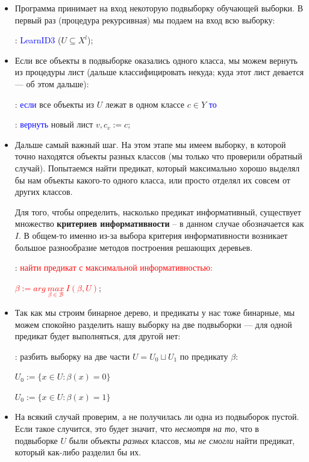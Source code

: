 \documentclass{article}
\begin{document}
\begin{itemize}
\item Программа принимает на вход некоторую подвыборку обучающей выборки. В первый раз (процедура рекурсивная) мы подаем на вход всю выборку:

: \textcolor{blue}{LearnID3} ($U \subseteq X^l$);

\item Если все объекты в подвыборке оказались одного класса, мы можем вернуть из процедуры лист (дальше классифицировать некуда; куда этот лист девается --- об этом дальше):

: \textcolor{blue}{если}
				все объекты из $U$ лежат в одном классе $c \in Y$
			\textcolor{blue}{то}

: \qquad \textcolor{blue}{вернуть} новый лист $v, c_v := c$;

\item Дальше самый важный шаг. На этом этапе мы имеем выборку, в которой точно находятся объекты разных классов (мы только что проверили обратный случай). Попытаемся найти предикат, который максимально хорошо выделял бы нам объекты какого-то одного класса, или просто отделял их совсем от других классов.

Для того, чтобы определить, насколько предикат информативный, существует множество \textbf{критериев информативности} -- в данном случае обозначается как $I$. В общем-то именно из-за выбора критерия информативности возникает большое разнообразие методов построения решающих деревьев.

: \textcolor{red}{найти предикат с максимальной информативностью:}

\qquad \textcolor{red}{$\beta := arg\ \underset{\beta \in \mathscr{B}}{max}\ I(\beta, U)$};

\item Так как мы строим бинарное дерево, и предикаты у нас тоже бинарные, мы можем спокойно разделить нашу выборку на две подвыборки --- для одной предикат будет выполняться, для другой нет:

:  разбить выборку на две части $U = U_0 \sqcup U_1$ по предикату $\beta$:

\qquad \qquad 			 $U_0 := \{x \in U: \beta(x) = 0\}$

\qquad \qquad 			 $U_0 := \{x \in U: \beta(x) = 1\}$

\item На всякий случай проверим, а не получилась ли одна из подвыборок пустой. Если такое случится, это будет значит, что \textit{несмотря на то}, что в подвыборке $U$ были объекты \textit{разных} классов, мы \textit{не смогли} найти предикат, который как-либо разделил бы их.


\end{itemize}
\end{document}
